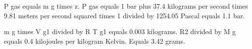 P gas equals m g times z.  
P gas equals 1 bar plus 37.4 kilograms per second times 9.81 meters per second squared times 1 divided by 1254.05 Pascal equals 1.1 bar.

m g times V g1 divided by R T g1 equals 0.003 kilograms.  
R2 divided by M g equals 0.4 kilojoules per kilogram Kelvin.  
Equals 3.42 grams.